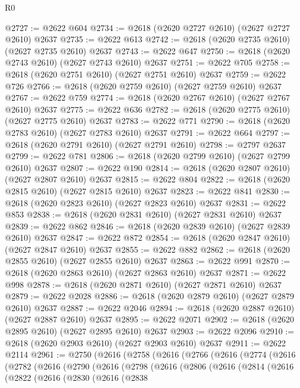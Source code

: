 \begin{lexlean}{R0}
\begin{coremodule}
@2727 := @2622 @604
@2734 := @2618 (@2620 @2727 @2610) (@2627 @2727 @2610) @2637
@2735 := @2622 @613
@2742 := @2618 (@2620 @2735 @2610) (@2627 @2735 @2610) @2637
@2743 := @2622 @647
@2750 := @2618 (@2620 @2743 @2610) (@2627 @2743 @2610) @2637
@2751 := @2622 @705
@2758 := @2618 (@2620 @2751 @2610) (@2627 @2751 @2610) @2637
@2759 := @2622 @726
@2766 := @2618 (@2620 @2759 @2610) (@2627 @2759 @2610) @2637
@2767 := @2622 @759
@2774 := @2618 (@2620 @2767 @2610) (@2627 @2767 @2610) @2637
@2775 := @2622 @636
@2782 := @2618 (@2620 @2775 @2610) (@2627 @2775 @2610) @2637
@2783 := @2622 @771
@2790 := @2618 (@2620 @2783 @2610) (@2627 @2783 @2610) @2637
@2791 := @2622 @664
@2797 := @2618 (@2620 @2791 @2610) (@2627 @2791 @2610)
@2798 := @2797 @2637
@2799 := @2622 @781
@2806 := @2618 (@2620 @2799 @2610) (@2627 @2799 @2610) @2637
@2807 := @2622 @190
@2814 := @2618 (@2620 @2807 @2610) (@2627 @2807 @2610) @2637
@2815 := @2622 @804
@2822 := @2618 (@2620 @2815 @2610) (@2627 @2815 @2610) @2637
@2823 := @2622 @841
@2830 := @2618 (@2620 @2823 @2610) (@2627 @2823 @2610) @2637
@2831 := @2622 @853
@2838 := @2618 (@2620 @2831 @2610) (@2627 @2831 @2610) @2637
@2839 := @2622 @862
@2846 := @2618 (@2620 @2839 @2610) (@2627 @2839 @2610) @2637
@2847 := @2622 @872
@2854 := @2618 (@2620 @2847 @2610) (@2627 @2847 @2610) @2637
@2855 := @2622 @882
@2862 := @2618 (@2620 @2855 @2610) (@2627 @2855 @2610) @2637
@2863 := @2622 @991
@2870 := @2618 (@2620 @2863 @2610) (@2627 @2863 @2610) @2637
@2871 := @2622 @998
@2878 := @2618 (@2620 @2871 @2610) (@2627 @2871 @2610) @2637
@2879 := @2622 @2028
@2886 := @2618 (@2620 @2879 @2610) (@2627 @2879 @2610) @2637
@2887 := @2622 @2046
@2894 := @2618 (@2620 @2887 @2610) (@2627 @2887 @2610) @2637
@2895 := @2622 @2071
@2902 := @2618 (@2620 @2895 @2610) (@2627 @2895 @2610) @2637
@2903 := @2622 @2096
@2910 := @2618 (@2620 @2903 @2610) (@2627 @2903 @2610) @2637
@2911 := @2622 @2114
@2961 := @2750
    (@2616
      (@2758
        (@2616
          (@2766
            (@2616
              (@2774
                (@2616
                  (@2782
                    (@2616
                      (@2790
                        (@2616
                          (@2798
                            (@2616
                              (@2806
                                (@2616
                                  (@2814
                                    (@2616
                                      (@2822
                                        (@2616
                                          (@2830
                                            (@2616
                                              (@2838

\end{coremodule}
\end{lexlean}
